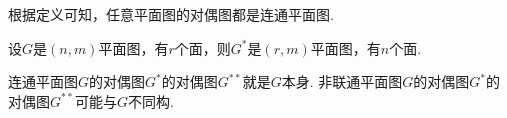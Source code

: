 根据定义可知，任意平面图的对偶图都是连通平面图.

设\(G\)是\((n,m)\)平面图，有\(r\)个面，则\(G^*\)是\((r,m)\)平面图，有\(n\)个面.

连通平面图\(G\)的对偶图\(G^*\)的对偶图\(G^{**}\)就是\(G\)本身.
非联通平面图\(G\)的对偶图\(G^*\)的对偶图\(G^{**}\)可能与\(G\)不同构.
